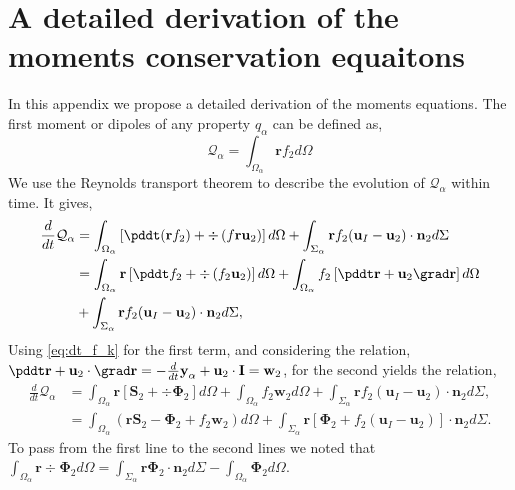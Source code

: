 \section{A detailed derivation of the moments conservation equaitons}
\label{ap:moment_derivative}
In this appendix we propose a detailed derivation of the moments equations. 
The first moment or dipoles of any property $q_\alpha$ can be defined as,
\begin{equation*}
    \mathcal{Q}_\alpha 
    = \int_{\Omega_\alpha} \textbf{r} f_2 d\Omega
\end{equation*}
We use the Reynolds transport theorem to describe the evolution of $\mathcal{Q}_\alpha$ within time. 
It gives, 
\begin{align*}
    \frac{d}{dt} \mathcal{Q}_\alpha
      &=  \int_{\Omega_\alpha} \left[
        \pddt(\textbf{r}  f_2)
        + \div \left(f \textbf{r} \textbf{u}_2\right)
    \right]d\Omega + \int_{\Sigma_\alpha} \textbf{r}  f_2  (\textbf{u}_I-\textbf{u}_2)\cdot \textbf{n}_2  d\Sigma  \nonumber \\
    &=  \int_{\Omega_\alpha} \textbf{r}\left[
        \pddt f_2
        + \div \left(f_2 \textbf{u}_2\right)
    \right] d\Omega
    + \int_{\Omega_\alpha} f_2 \left[
        \pddt \textbf{r}
        +\textbf{u}_2 \grad \textbf{r}
    \right]d\Omega\\
    &+ \int_{\Sigma_\alpha} \textbf{r}  f_2 (\textbf{u}_I-\textbf{u}_2)\cdot \textbf{n}_2  d\Sigma,
\end{align*}
Using \ref{eq:dt_f_k} for the first term, and considering the relation,
$  \pddt \textbf{r}
+ \textbf{u}_2 \cdot \grad \textbf{r}
= - \frac{d}{dt} \textbf{y}_\alpha  + \textbf{u}_2 \cdot \textbf{I}
= \textbf{w}_2$,
for the second yields the relation,
\begin{align*}
    \frac{d}{dt} \mathcal{Q}_\alpha
    &= \int_{\Omega_\alpha} \textbf{r} \left[
         \textbf{S}_2 +  \div \mathbf{\Phi}_2
    \right]d\Omega
    +\int_{\Omega_\alpha} f_2  \textbf{w}_2 d\Omega
    + \int_{\Sigma_\alpha} \textbf{r}  f_2 (\textbf{u}_I-\textbf{u}_2)\cdot \textbf{n}_2  d\Sigma,\\
    &= \int_{\Omega_\alpha} \left( 
        \textbf{r} \textbf{S}_2 
        - \mathbf{\Phi}_2
        + f_2  \textbf{w}_2 
    \right) d\Omega
    + \int_{\Sigma_\alpha} \textbf{r} \left[
        \mathbf{\Phi}_2
        + f_2 (\textbf{u}_I-\textbf{u}_2)
    \right]\cdot \textbf{n}_2  d\Sigma.
\end{align*}
To pass from the first line to the second lines we noted that $\int_{\Omega_\alpha} \textbf{r}  \div \mathbf{\Phi}_2 d\Omega
= \int_{\Sigma_\alpha} \textbf{r} \mathbf{\Phi}_2 \cdot \textbf{n}_2 d\Sigma
- \int_{\Omega_\alpha} \mathbf{\Phi}_2 d\Omega$. 

